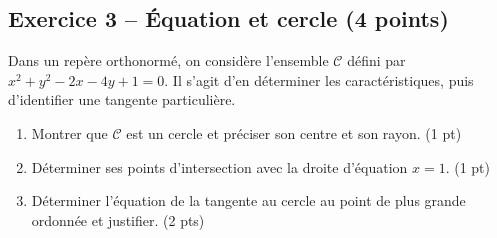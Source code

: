 \subsection*{Exercice 3 -- Équation et cercle (4 points)}
Dans un repère orthonormé, on considère l’ensemble $\mathcal C$ défini par $x^2+y^2-2x-4y+1=0$. Il s’agit d’en déterminer les caractéristiques, puis d’identifier une tangente particulière.
\begin{enumerate}
\item Montrer que $\mathcal C$ est un cercle et préciser son centre et son rayon. \hfill(1 pt)
\item Déterminer ses points d’intersection avec la droite d’équation $x=1$. \hfill(1 pt)
\item Déterminer l’équation de la tangente au cercle au point de plus grande ordonnée et justifier. \hfill(2 pts)
\end{enumerate}
